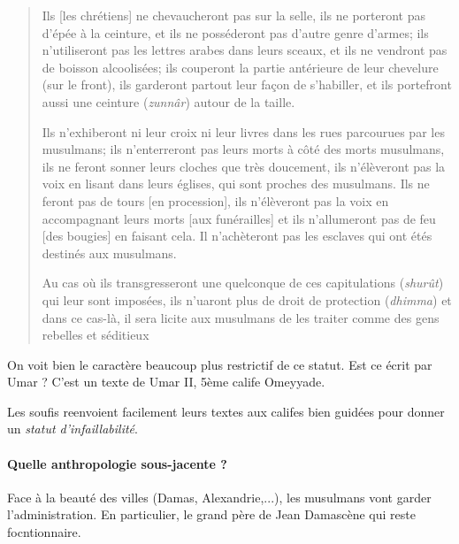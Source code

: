 

\begin{quote}
 Ils [les chrétiens] ne chevaucheront pas sur la selle, ils ne porteront pas d'épée à la ceinture, et ils ne posséderont pas d'autre genre d'armes; ils n'utiliseront pas les lettres arabes dans leurs sceaux, et ils ne vendront pas de boisson alcoolisées; ils couperont la partie antérieure de leur chevelure (sur le front), ils garderont partout leur façon de s'habiller, et ils portefront aussi une ceinture (\textit{zunnâr}) autour de la taille.
 
 Ils n'exhiberont ni leur croix ni leur livres dans les rues parcourues par les musulmans; ils n'enterreront pas leurs morts à côté des morts musulmans, ils ne feront sonner leurs cloches que très doucement, ils n'élèveront pas la voix en lisant dans leurs églises, qui sont proches des musulmans.
 Ils ne feront pas de tours [en procession], ils n'élèveront pas la voix en accompagnant leurs morts [aux funérailles] et ils n'allumeront pas de feu [des bougies] en faisant cela. Il n'achèteront pas les esclaves qui ont étés destinés aux musulmans.

 Au cas où ils transgresseront une quelconque de ces capitulations (\textit{shurût}) qui leur sont imposées, ils n'uaront plus de droit de protection (\textit{dhimma}) et dans ce cas-là, il sera licite aux musulmans de les traiter comme des gens rebelles et séditieux

 \end{quote}
On voit bien le caractère beaucoup plus restrictif de ce statut.
 Est ce écrit par Umar ?  C'est un texte de Umar II, 5ème calife Omeyyade.

 Les soufis reenvoient facilement leurs textes aux califes bien guidées pour donner un \textit{statut d'infaillabilité}. 

 \paragraph{Quelle anthropologie sous-jacente ?} Face à la beauté des villes (Damas, Alexandrie,...), les musulmans vont garder l'administration. En particulier, le grand père de Jean Damascène qui reste focntionnaire.

 